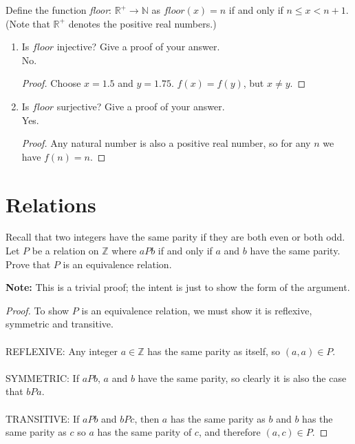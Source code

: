\documentclass[]{exam}
\theoremstyle{definition}
\newcommand{\bb}[1]{\mathbb{#1}}
\newcommand{\Z}{\bb{Z}}
\newcommand{\R}{\bb{R}}
\newcommand{\N}{\bb{N}}
\begin{document}
\begin{questions}
\begin{enumerate}[label=\alph*)]
\end{enumerate}

\question
Define the function \emph{floor}: $\R^+ \to \N$ as $floor(x) = n$ if and only if
$n \leq x < n+1$. (Note that $\R^+$ denotes the positive real numbers.)

\begin{enumerate}[label=\alph*)]
\item Is $floor$ injective? Give a proof of your answer. 
\\
No.
\begin{proof}
Choose $x = 1.5$ and $y = 1.75$. $f(x) = f(y)$, but $x \neq y$.
\end{proof}

\item Is $floor$ surjective? Give a proof of your answer.
\\
Yes.
\begin{proof}
Any natural number is also a positive real number, so for any $n$ we have $f(n) = n$. 
\end{proof}

\end{enumerate}

\section*{Relations}

\question Recall that two integers have the same parity if they are both
          even or both odd. Let $P$ be a relation on $\Z$ where $aPb$
          if and only if $a$ and $b$ have the same parity. Prove that
          $P$ is an equivalence relation.

\textbf{Note:} This is a trivial proof; the intent is just to show the form of the
  argument.
\begin{proof}
To show $P$ is an equivalence relation, we must show it is reflexive, symmetric
and transitive.
\\~\\
REFLEXIVE: Any integer $a \in \Z$ has the same parity as itself, so $(a,a) \in
P$.
\\~\\
SYMMETRIC: If $aPb$, $a$ and $b$ have the same parity, so clearly it is also the
case that $bPa$.
\\~\\
TRANSITIVE: If $aPb$ and $bPc$, then $a$ has the same parity as $b$ and $b$ has
the same parity as $c$ so $a$ has the same parity of $c$, and therefore $(a,c)
\in P$. 
\end{proof}


\end{questions}
\end{document}
